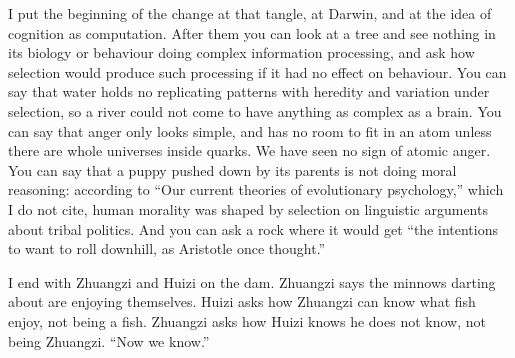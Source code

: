 I put the beginning of the change at that tangle, at Darwin, and at the idea of cognition as computation. After them you can look at a tree and see nothing in its biology or behaviour doing complex information processing, and ask how selection would produce such processing if it had no effect on behaviour. You can say that water holds no replicating patterns with heredity and variation under selection, so a river could not come to have anything as complex as a brain. You can say that anger only looks simple, and has no room to fit in an atom unless there are whole universes inside quarks. We have seen no sign of atomic anger. You can say that a puppy pushed down by its parents is not doing moral reasoning: according to ``Our current theories of evolutionary psychology,'' which I do not cite, human morality was shaped by selection on linguistic arguments about tribal politics. And you can ask a rock where it would get ``the intentions to want to roll downhill, as Aristotle once thought.'' 

I end with Zhuangzi and Huizi on the dam. Zhuangzi says the minnows darting about are enjoying themselves. Huizi asks how Zhuangzi can know what fish enjoy, not being a fish. Zhuangzi asks how Huizi knows he does not know, not being Zhuangzi. ``Now we know.''
